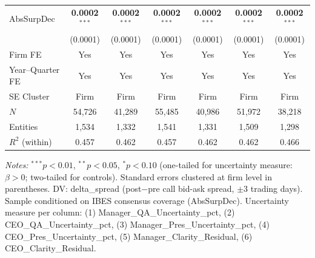 \documentclass[12pt,a4paper]{article}
\begin{document}
\begin{table}[H]
\begin{threeparttable}
\begin{footnotesize}
\begin{tabular}{lcccccc}
AbsSurpDec & \textbf{0.0002}$^{***}$ & \textbf{0.0002}$^{***}$ & \textbf{0.0002}$^{***}$ & \textbf{0.0002}$^{***}$ & \textbf{0.0002}$^{***}$ & \textbf{0.0002}$^{***}$ \\
 & (0.0001) & (0.0001) & (0.0001) & (0.0001) & (0.0001) & (0.0001) \\[1pt]
\midrule
Firm FE & Yes & Yes & Yes & Yes & Yes & Yes \\
Year--Quarter FE & Yes & Yes & Yes & Yes & Yes & Yes \\
SE Cluster & Firm & Firm & Firm & Firm & Firm & Firm \\
$N$ & 54,726 & 41,289 & 55,485 & 40,986 & 51,972 & 38,218 \\
Entities & 1,534 & 1,332 & 1,541 & 1,331 & 1,509 & 1,298 \\
$R^2$ (within) & 0.457 & 0.462 & 0.457 & 0.462 & 0.462 & 0.466 \\
\bottomrule
\end{tabular}
\end{footnotesize}
\begin{tablenotes}[flushleft]
\footnotesize
\item \textit{Notes:} $^{***}p<0.01$, $^{**}p<0.05$, $^{*}p<0.10$ (one-tailed for uncertainty measure: $\beta > 0$; two-tailed for controls). Standard errors clustered at firm level in parentheses. DV: delta\_spread (post$-$pre call bid-ask spread, $\pm$3 trading days). Sample conditioned on IBES consensus coverage (AbsSurpDec). Uncertainty measure per column: (1) Manager\_QA\_Uncertainty\_pct, (2) CEO\_QA\_Uncertainty\_pct, (3) Manager\_Pres\_Uncertainty\_pct, (4) CEO\_Pres\_Uncertainty\_pct, (5) Manager\_Clarity\_Residual, (6) CEO\_Clarity\_Residual.
\end{tablenotes}
\end{threeparttable}
\end{table}
\end{document}
